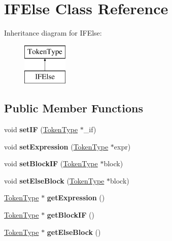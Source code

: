 \hypertarget{class_i_f_else}{\section{I\-F\-Else Class Reference}
\label{class_i_f_else}
}
Inheritance diagram for I\-F\-Else\-:\begin{figure}[H]
\begin{center}
\leavevmode
\includegraphics[height=2.000000cm]{class_i_f_else}
\end{center}
\end{figure}
\subsection*{Public Member Functions}
\begin{DoxyCompactItemize}
\item 
\hypertarget{class_i_f_else_a141bc736d3a84b62755583ef66b0e06e}{void {\bfseries set\-I\-F} (\hyperlink{class_token_type}{Token\-Type} $\ast$\-\_\-if)}\label{class_i_f_else_a141bc736d3a84b62755583ef66b0e06e}

\item 
\hypertarget{class_i_f_else_a5a8044af71dbc6183923611367146ed8}{void {\bfseries set\-Expression} (\hyperlink{class_token_type}{Token\-Type} $\ast$expr)}\label{class_i_f_else_a5a8044af71dbc6183923611367146ed8}

\item 
\hypertarget{class_i_f_else_a3a0f6dec06c70cd36a9e584ea59ac590}{void {\bfseries set\-Block\-I\-F} (\hyperlink{class_token_type}{Token\-Type} $\ast$block)}\label{class_i_f_else_a3a0f6dec06c70cd36a9e584ea59ac590}

\item 
\hypertarget{class_i_f_else_af899b6a6fdf1d242a3a6fcb82c2a7bed}{void {\bfseries set\-Else\-Block} (\hyperlink{class_token_type}{Token\-Type} $\ast$block)}\label{class_i_f_else_af899b6a6fdf1d242a3a6fcb82c2a7bed}

\item 
\hypertarget{class_i_f_else_ab57532ebd0f594e6b63f177e2048e4e6}{\hyperlink{class_token_type}{Token\-Type} $\ast$ {\bfseries get\-Expression} ()}\label{class_i_f_else_ab57532ebd0f594e6b63f177e2048e4e6}

\item 
\hypertarget{class_i_f_else_a823b002825a5b52e53d2cfb00bfccbc3}{\hyperlink{class_token_type}{Token\-Type} $\ast$ {\bfseries get\-Block\-I\-F} ()}\label{class_i_f_else_a823b002825a5b52e53d2cfb00bfccbc3}

\item 
\hypertarget{class_i_f_else_a637b37e809e0e9abd475689eb03d5334}{\hyperlink{class_token_type}{Token\-Type} $\ast$ {\bfseries get\-Else\-Block} ()}\label{class_i_f_else_a637b37e809e0e9abd475689eb03d5334}

\end{DoxyCompactItemize}


